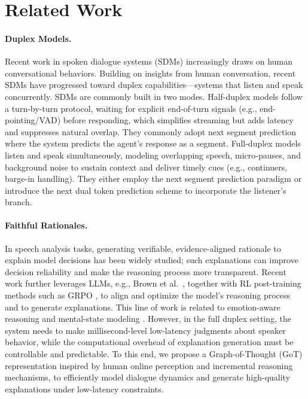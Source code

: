 \section{Related Work}

\paragraph{Duplex Models.}
Recent work in spoken dialogue systems (SDMs) increasingly draws on human conversational behaviors. Building on insights from human conversation, recent SDMs have progressed toward duplex capabilities—systems that listen and speak concurrently. SDMs are commonly built in two modes. Half-duplex models follow a turn-by-turn protocol, waiting for explicit end-of-turn signals (e.g., end-pointing/VAD) before responding, which simplifies streaming but adds latency and suppresses natural overlap. They commonly adopt next segment prediction \citep{hara18_interspeech,li-etal-2022-speak,5494991} where the system predicts the agent's response as a segment. Full-duplex models listen and speak simultaneously, modeling overlapping speech, micro-pauses, and background noise to sustain context and deliver timely cues (e.g., continuers, barge-in handling). They either employ the next segment prediction paradigm \citep{arxiv:2503.01174,dgslm,vap} or introduce the next dual token prediction \citep{arxiv:2203.16502, defossez2024moshi} scheme to incorporate the listener's branch.
\paragraph{Faithful Rationales.}
In speech analysis tasks, generating verifiable, evidence-aligned rationale to explain model decisions has been widely studied; such explanations can improve decision reliability and make the reasoning process more transparent. 
Recent work further leverages LLMs, e.g., Brown et al.~\citeyearpar{brown2020languagemodelsfewshotlearners}, together with RL post-training methods such as GRPO \citep{zhang2025grpoleaddifficultyawarereinforcementlearning}, to align and optimize the model's reasoning process and to generate explanations.
This line of work is related to emotion-aware reasoning \citep{wang2026emotionthinkerprosodyawarereinforcementlearning,xu2023secapspeechemotioncaptioning,cheng2024emotionllamamultimodalemotionrecognition,zhang2025classificationspeechemotionreasoning} and mental-state modeling \citep{sclar2024explore}. However, in the full duplex setting, the system needs to make millisecond-level low-latency judgments about speaker behavior, while the computational overhead of explanation generation must be controllable and predictable. To this end, we propose a Graph-of-Thought (GoT) representation inspired by human online perception and incremental reasoning mechanisms, to efficiently model dialogue dynamics and generate high-quality explanations under low-latency constraints.
